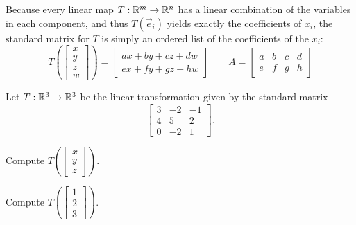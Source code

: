 \begin{fact}
  Because every linear map \(T:\mathbb{R}^m\to\mathbb{R}^n\) has a linear combination
  of the variables in each component, and thus
  \(T(\vec e_i)\) yields exactly the coefficients of \(x_i\),
  the standard matrix for \(T\) is simply an ordered list of
  the coefficients of the \(x_i\):
  \[
    T\left(\begin{bmatrix}x\\y\\z\\w\end{bmatrix}\right)
      =
    \begin{bmatrix}
      ax+by+cz+dw \\
      ex+fy+gz+hw
    \end{bmatrix}
  \hspace{2em}
    A
      =
    \begin{bmatrix}
      a & b & c & d \\
      e & f & g & h
    \end{bmatrix}
  \]
\end{fact}

\begin{activity}{5}
  Let $T: \mathbb{R}^3 \rightarrow \mathbb{R}^3$ be the linear transformation given by the standard matrix
  \[
    \begin{bmatrix} 3  & -2 & -1  \\ 4 & 5 & 2 \\ 0 & -2 & 1 \end{bmatrix}
  .\]

\begin{subactivity}
Compute $T\left(\begin{bmatrix} x\\ y \\ z \end{bmatrix} \right) $.
\end{subactivity}
\begin{subactivity}
Compute $T\left(\begin{bmatrix} 1\\ 2 \\ 3 \end{bmatrix} \right) $.
\end{subactivity}
\end{activity}

